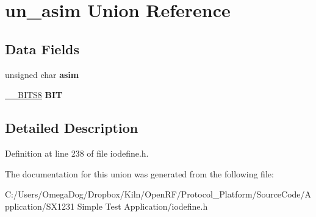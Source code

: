 \hypertarget{unionun__asim}{\section{un\-\_\-asim Union Reference}
\label{unionun__asim}
}
\subsection*{Data Fields}
\begin{DoxyCompactItemize}
\item 
\hypertarget{unionun__asim_a8492d7e89066b9a8b4c1430ec8e84958}{unsigned char {\bfseries asim}}\label{unionun__asim_a8492d7e89066b9a8b4c1430ec8e84958}

\item 
\hypertarget{unionun__asim_a4c627c06c9f7a832833051865150571e}{\hyperlink{struct_____b_i_t_s8}{\-\_\-\-\_\-\-B\-I\-T\-S8} {\bfseries B\-I\-T}}\label{unionun__asim_a4c627c06c9f7a832833051865150571e}

\end{DoxyCompactItemize}


\subsection{Detailed Description}


Definition at line 238 of file iodefine.\-h.



The documentation for this union was generated from the following file\-:\begin{DoxyCompactItemize}
\item 
C\-:/\-Users/\-Omega\-Dog/\-Dropbox/\-Kiln/\-Open\-R\-F/\-Protocol\-\_\-\-Platform/\-Source\-Code/\-Application/\-S\-X1231 Simple Test Application/iodefine.\-h\end{DoxyCompactItemize}
